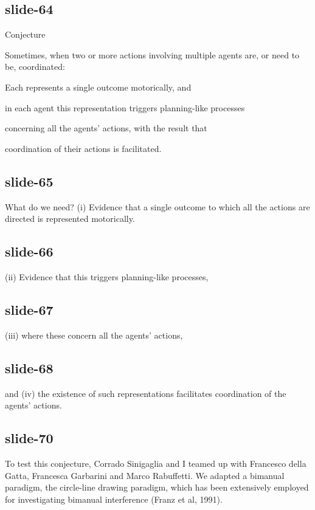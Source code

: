 \documentclass[12pt,\papersize]{extarticle}
\begin{document}
\subsection{slide-64}
Conjecture



Sometimes, when two or more actions involving multiple agents are, or need to be, coordinated:




Each represents a single outcome motorically, and


in each agent this representation triggers planning-like processes


concerning all the agents’ actions, with the result that


coordination of their actions is facilitated.



\subsection{slide-65}
What do we need?
(i) Evidence that a single outcome to which all the actions are directed is represented motorically.

\subsection{slide-66}
(ii) Evidence that this triggers planning-like processes,

\subsection{slide-67}
(iii) where these  concern all the agents' actions,

\subsection{slide-68}
and (iv) the existence of such representations facilitates coordination of the agents' actions.

\subsection{slide-70}
To test this conjecture, Corrado Sinigaglia and I teamed up with
Francesco della Gatta, Francesca Garbarini and Marco Rabuffetti.
We adapted a bimanual paradigm, the circle-line drawing paradigm, which has been
extensively employed for investigating bimanual interference (Franz et al, 1991).
\end{document}
